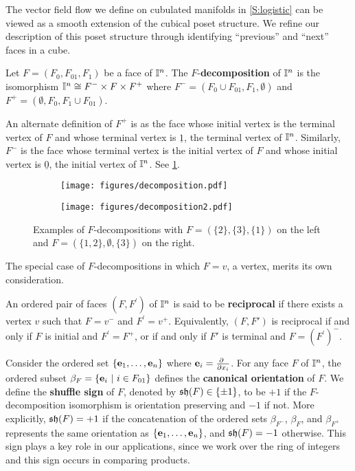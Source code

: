 The vector field flow we define on cubulated manifolds in \cref{S:logistic} can be viewed as a smooth extension of the cubical poset structure.
We refine our description of this poset structure through identifying ``previous'' and ``next'' faces in a cube.

\begin{definition}\label{D:F decomposition}
	Let $F = (F_0, F_{01}, F_1)$ be a face of $\mathbb{I}^n$. The $F$-\textbf{decomposition} of $\mathbb{I}^n$ is the isomorphism $\mathbb{I}^n \cong F^- \times F \times F^+$ where $F^- = (F_0 \cup F_{01}, F_1, \emptyset)$ and $F^+ = (\emptyset, F_0, F_1 \cup F_{01})$.
\end{definition}

An alternate definition of $F^+$ is as the face whose initial vertex is the terminal vertex of $F$ and whose terminal vertex is $\underline{1}$,
the terminal vertex of $\mathbb{I}^n$.
Similarly, $F^-$ is the face whose terminal vertex is the initial vertex of $F$ and whose initial vertex is $\underline{0}$, the initial vertex of $\mathbb{I}^n$. See \cref{F:decomposition}.

\begin{figure}[h!]
	\begin{subfigure}[b]{0.35\textwidth}
		\centering
		\texttt{[image: figures/decomposition.pdf]}
	\end{subfigure}
	\begin{subfigure}[b]{0.35\textwidth}
		\centering
		\texttt{[image: figures/decomposition2.pdf]}
	\end{subfigure}
	\caption{Examples of $F$-decompositions with $F = (\{2\}, \{3\}, \{1\})$ on the left and $F = (\{1,2\}, \emptyset, \{3\})$ on the right.}
	\label{F:decomposition}
\end{figure}

The special case of $F$-decompositions in which $F = v$, a vertex, merits its own consideration.

\begin{definition}\label{D:reciprocal}
	An ordered pair of faces $(F,F^\prime)$ of $\mathbb{I}^n$ is said to be \textbf{reciprocal} if there exists a vertex $v$ such that $F = v^-$ and $F^\prime = v^+$. Equivalently, $(F, F')$ is reciprocal if and only if $F$ is initial and $F^\prime = F^+$, or if and only if $F'$ is terminal and $F = (F^{\prime})^-$.
\end{definition}

Consider the ordered set $\{\mathbf{e}_1, \dots, \mathbf{e}_n\}$ where $\e_i = \frac{\partial\ }{\partial x_i}$.
For any face $F$ of $\mathbb{I}^n$, the ordered subset $\beta_F = \{\mathbf{e}_i\ |\ i \in F_{01}\}$ defines the \textbf{canonical orientation} of $F$.
We define the \textbf{shuffle sign} of $F$, denoted by $\mathfrak{sh}(F) \in \{\pm 1\}$, to be $+1$ if the $F$-decomposition isomorphism is orientation preserving and $-1$ if not.
More explicitly, $\mathfrak{sh}(F) = +1$ if the concatenation of the ordered sets $\beta_{F^-}$, $\beta_{F}$, and $\beta_{F^+}$ represents the same orientation as $\{\mathbf{e}_1, \dots, \mathbf{e}_n\}$, and $\mathfrak{sh}(F) = -1$ otherwise.
This sign plays a key role in our applications, since we work over the ring of integers and this sign occurs in comparing products.


